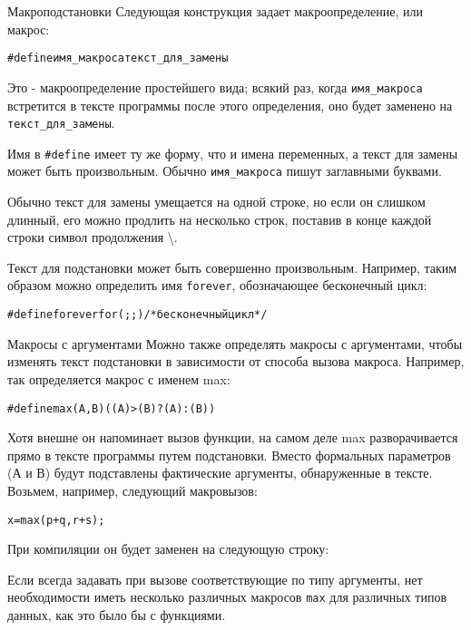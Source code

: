 \documentclass{beamer}
\begin{document}
\begin{frame}{Макроподстановки}
    Следующая конструкция задает макроопределение, или макрос:
    
    \begin{alltt}
    \#define имя\_макроса текст\_для\_замены
    \end{alltt}
    
    Это - макроопределение простейшего вида; всякий раз, когда \texttt{имя\_макроса} встретится в тексте программы после этого определения, оно будет заменено на \texttt{текст\_для\_замены}.
    
    Имя в \texttt{#define} имеет ту же форму, что и имена переменных, а текст для замены может быть произвольным. Обычно \texttt{имя\_макроса} пишут заглавными буквами.
    
    Обычно текст для замены умещается на одной строке, но если он
    слишком длинный, его можно продлить на несколько строк, поставив в конце каждой строки символ продолжения \backslash.
    
    Текст для подстановки может быть совершенно произвольным. Например, таким образом можно определить имя \texttt{forever}, обозначающее бесконечный цикл:
    
    \begin{alltt}
    \#define forever for (;;) /* бесконечный цикл */
    \end{alltt}
    
\end{frame}

\begin{frame}{Макросы с аргументами}
    Можно также определять макросы с аргументами, чтобы изменять текст подстановки в зависимости от способа вызова макроса. Например, так определяется макрос с именем max:
    
    \begin{alltt}
    \#define max(А, В) ((А) > (В) ? (А) : (В))
    \end{alltt}
    
    Хотя внешне он напоминает вызов функции, на самом деле max
    разворачивается прямо в тексте программы путем подстановки. Вместо формальных параметров (А и В) будут подставлены фактические аргументы, обнаруженные в тексте. Возьмем, например, следующий макровызов:
    
    \begin{alltt}
    х = max(p+q, r+s);
    \end{alltt}
    
    При компиляции он будет заменен на следующую строку:
    
    \begin{alltt}
    \end{alltt}
    
    Если всегда задавать при вызове соответствующие по типу аргументы, нет необходимости иметь несколько различных макросов \texttt{max} для различных типов данных, как это было бы с функциями.
\end{frame}
\end{document}
